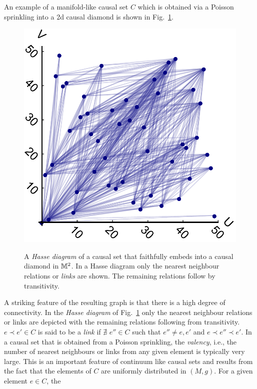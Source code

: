 An example of a manifold-like causal set $C$ which is obtained via a Poisson sprinkling into a
2d causal diamond is shown in Fig.~\ref{2drandom.fig}.
\begin{figure}[ht]
\centering \resizebox{3in}{!}  {\includegraphics[angle=45]{finalset_nice_random}}
\caption{A \emph{Hasse diagram}  of a causal set that faithfully embeds into a causal diamond in $\mathbb M^2$. In a Hasse diagram
  only the nearest neighbour relations or \emph{links} are shown. The remaining relations follow by transitivity.}
\label{2drandom.fig}
\end{figure}
A striking feature of the resulting graph is that there is a high degree of connectivity. In the
 \emph{Hasse diagram} of Fig.~\ref{2drandom.fig} only the nearest neighbour relations or {links} are depicted with the remaining relations following from
 transitivity.  $e \prec e' \in C$  is said to be  a  \emph{link} if   $\nexists \, \, e''\in C$  
such 
 that $e''\neq e,e'$ and $e\prec e''\prec e'$.    In 
 a  causal set that is obtained from a Poisson sprinkling, the \emph{valency}, i.e., the number of nearest neighbours or
 links from any given element  is typically very large. This is an important feature of continuum
 like causal sets and results from the fact that the elements of $C$ are uniformly distributed in $(M,g)$.  For a given
 element $e \in C$, the
